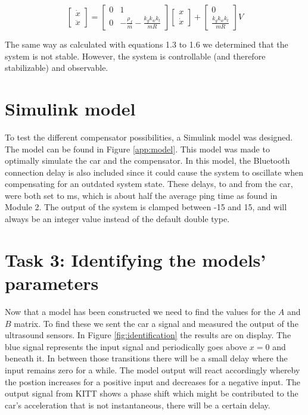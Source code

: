 \documentclass[final]{scrreprt} %
\begin{document}
\begin{equation}
	\begin{bmatrix}
		\dot{x} \\
		\ddot{x}
	\end{bmatrix} =
	\begin{bmatrix}
		0 & 1 \\
		0 & -\frac{\rho_f}{m} - \frac{k_g k_w k_t}{mR}
	\end{bmatrix}
	\begin{bmatrix}
		x \\
		\dot{x}
	\end{bmatrix} +
	\begin{bmatrix}
		0 \\
		\frac{k_g k_w k_t}{mR}
	\end{bmatrix}
	V
	\label{eq:total_system_matrix}
\end{equation}

The same way as calculated with equations 1.3 to 1.6 we determined that the system is not stable.
However, the system is controllable (and therefore stabilizable) and observable.

\section*{Simulink model}
To test the different compensator possibilities, a Simulink model was designed.
The model can be found in Figure \ref{app:model}.
This model was made to optimally simulate the car and the compensator.
In this model, the Bluetooth connection delay is also included since it could cause the system to oscillate when compensating for an outdated system state.
These delays, to and from the car, were both set to \unit[50]{ms}, which is about half the average ping time as found in Module 2.
The output of the system is clamped between -15 and 15, and will always be an integer value instead of the default double type.

\section*{Task 3: Identifying the models' parameters}
Now that a model has been constructed we need to find the values for the $A$ and $B$ matrix.
To find these we sent the car a signal and measured the output of the ultrasound sensors.
In Figure \ref{fig:identification} the results are on display.
The blue signal represents the input signal and periodically goes above $x=0$ and beneath it.
In between those transitions there will be a small delay where the input remains zero for a while.
The model output will react accordingly whereby the postion increases for a positive input and decreases for a negative input.
The output signal from KITT shows a phase shift which might be contributed to the car's acceleration that is not instantaneous, there will be a certain delay.
\end{document}
